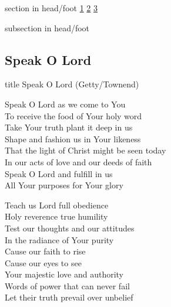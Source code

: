 \documentclass{beamer}
\begin{document}
{
{ 
 {
 \begin{beamercolorbox}[ht=4.5ex,dp=1.5ex,%
      leftskip=.3cm,rightskip=.3cm plus1fil]{section in head/foot}
 \fontsize{12}{25}\selectfont 
\hyperlink{Speak O Lord[](Getty/Townend)1}{1}
\hyperlink{Speak O Lord[](Getty/Townend)2}{2}
\hyperlink{Speak O Lord[](Getty/Townend)3}{3}
 
 \end{beamercolorbox}%
  \begin{beamercolorbox}[ht=2.5ex,dp=1.125ex,%
   leftskip=.3cm,rightskip=.3cm plus1fil]{subsection in head/foot}
   \insertauthor
 \end{beamercolorbox}%
 }
}
\subsection{ Speak O Lord }

\hypertarget{Speak O Lord[](Getty/Townend)}{}
\begin{frame}{}
 \vfill
  \centering
  \begin{beamercolorbox}[sep=8pt,center,shadow=true,rounded=true]{title}
    Speak O Lord (Getty/Townend)    
  \end{beamercolorbox}
  \vfill
\end{frame}

\hypertarget{Speak O Lord[](Getty/Townend)1}{}
\begin{frame}{}
\fontsize{ 15 }{ 19 }\selectfont

Speak O Lord as we come to You\\ 
To receive the food of Your holy word\\ 
Take Your truth plant it deep in us\\ 
Shape and fashion us in Your likeness\\ 
That the light of Christ might be seen today\\ 
In our acts of love and our deeds of faith\\ 
Speak O Lord and fulfill in us\\ 
All Your purposes for Your glory 

\end{frame}

\hypertarget{Speak O Lord[](Getty/Townend)2}{}
\begin{frame}{}
\fontsize{ 15 }{ 19 }\selectfont

Teach us Lord full obedience\\ 
Holy reverence true humility\\ 
Test our thoughts and our attitudes\\ 
In the radiance of Your purity\\ 
Cause our faith to rise\\ 
Cause our eyes to see\\ 
Your majestic love and authority\\ 
Words of power that can never fail\\ 
Let their truth prevail over unbelief 


\end{frame}}
\end{document}
